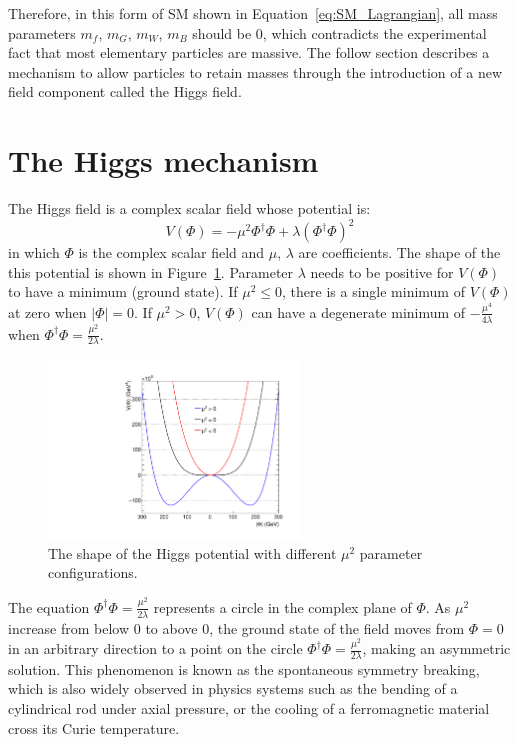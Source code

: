 Therefore, in this form of SM shown in Equation~\ref{eq:SM_Lagrangian}, all mass parameters $m_{f}$, $m_{G}$, $m_{W}$, $m_{B}$ should be 0,
which contradicts the experimental fact that most elementary particles are massive.
The follow section describes a mechanism to allow particles to retain masses 
through the introduction of a new field component called the Higgs field.


\section{The Higgs mechanism}\label{sec:Higgs_mech}

The Higgs field is a complex scalar field whose potential is:
\begin{equation} \label{eq:Higgs_potential}
    V(\Phi) = - \mu^{2} \Phi^{\dagger}\Phi + \lambda(\Phi^{\dagger}\Phi)^{2}
\end{equation}
in which $\Phi$ is the complex scalar field and $\mu$, $\lambda$ are coefficients.
The shape of the this potential is shown in Figure~\ref{fig:Higgs_potential}. 
Parameter $\lambda$ needs to be positive for $V(\Phi)$ to have a minimum (ground state).
If $\mu^{2} \leqslant 0$, there is a single minimum of $V(\Phi)$ at zero when $|\Phi| = 0$.
If $\mu^{2} > 0$, $V(\Phi)$ can have a degenerate minimum of $-\frac{\mu^{4}}{4\lambda}$ when $\Phi^{\dagger}\Phi = \frac{\mu^{2}}{2\lambda}$.

\begin{figure}[!htb]
  \centering
  \captionsetup{justification=justified}
  \includegraphics[width=0.6\textwidth]{pics/Intro/Higgs_field.pdf}
  \caption{The shape of the Higgs potential with different $\mu^{2}$ parameter configurations.}
  \label{fig:Higgs_potential}
\end{figure}

The equation $\Phi^{\dagger}\Phi = \frac{\mu^{2}}{2\lambda}$ represents a circle in the complex plane of $\Phi$.
As $\mu^{2}$ increase from below 0 to above 0, 
the ground state of the field moves from $\Phi = 0$ in an arbitrary direction to a point on the circle $\Phi^{\dagger}\Phi = \frac{\mu^{2}}{2\lambda}$, 
making an asymmetric solution.
This phenomenon is known as the spontaneous symmetry breaking, 
which is also widely observed in physics systems such as the 
bending of a cylindrical rod under axial pressure,
or the cooling of a ferromagnetic material cross its Curie temperature.

